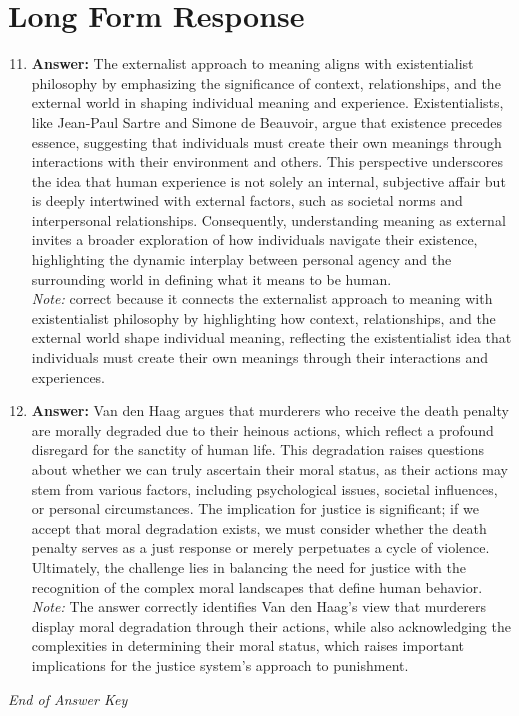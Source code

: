\documentclass[12pt]{article}
\begin{document}
\section*{Long Form Response}
\begin{enumerate}[label=\arabic*.]
\setcounter{enumi}{10}
\item \textbf{Answer:} The externalist approach to meaning aligns with existentialist philosophy by emphasizing the significance of context, relationships, and the external world in shaping individual meaning and experience. Existentialists, like Jean-Paul Sartre and Simone de Beauvoir, argue that existence precedes essence, suggesting that individuals must create their own meanings through interactions with their environment and others. This perspective underscores the idea that human experience is not solely an internal, subjective affair but is deeply intertwined with external factors, such as societal norms and interpersonal relationships. Consequently, understanding meaning as external invites a broader exploration of how individuals navigate their existence, highlighting the dynamic interplay between personal agency and the surrounding world in defining what it means to be human.
\\ \textit{Note:} correct because it connects the externalist approach to meaning with existentialist philosophy by highlighting how context, relationships, and the external world shape individual meaning, reflecting the existentialist idea that individuals must create their own meanings through their interactions and experiences.
\item \textbf{Answer:} Van den Haag argues that murderers who receive the death penalty are morally degraded due to their heinous actions, which reflect a profound disregard for the sanctity of human life. This degradation raises questions about whether we can truly ascertain their moral status, as their actions may stem from various factors, including psychological issues, societal influences, or personal circumstances. The implication for justice is significant; if we accept that moral degradation exists, we must consider whether the death penalty serves as a just response or merely perpetuates a cycle of violence. Ultimately, the challenge lies in balancing the need for justice with the recognition of the complex moral landscapes that define human behavior.
\\ \textit{Note:} The answer correctly identifies Van den Haag's view that murderers display moral degradation through their actions, while also acknowledging the complexities in determining their moral status, which raises important implications for the justice system's approach to punishment.
\end{enumerate}

\vfill
\noindent\textit{End of Answer Key}
\end{document}
